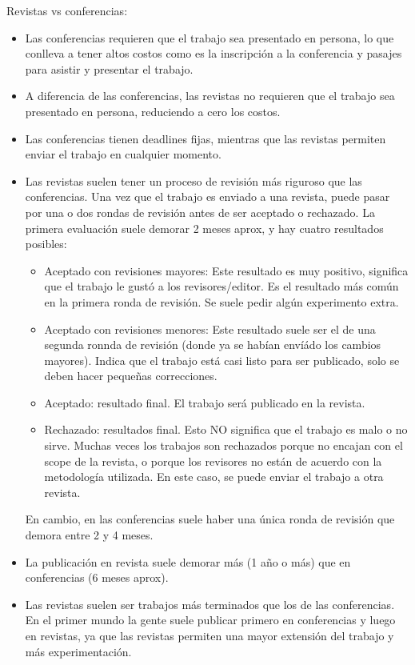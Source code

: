 \documentclass[a4paper,	11pt]{article}
\begin{document}
Revistas vs conferencias:
\begin{itemize}
    \item Las conferencias requieren que el trabajo sea presentado en persona, lo que conlleva a tener altos costos como es la inscripción a la conferencia y pasajes para asistir y presentar el trabajo.
    \item A diferencia de las conferencias, las revistas no requieren que el trabajo sea presentado en persona, reduciendo a cero los costos.
    \item Las conferencias tienen deadlines fijas, mientras que las revistas permiten enviar el trabajo en cualquier momento.
    \item Las revistas suelen tener un proceso de revisión más riguroso que las conferencias. Una vez que el trabajo es enviado a una revista, puede pasar por una o dos rondas de revisión antes de ser aceptado o rechazado. La primera evaluación suele demorar 2 meses aprox, y hay cuatro resultados posibles:
    \begin{itemize}
        \item Aceptado con revisiones mayores: Este resultado es muy positivo, significa que el trabajo le gustó a los revisores/editor. Es el resultado más común en la primera ronda de revisión. Se suele pedir algún experimento extra.
        \item Aceptado con revisiones menores: Este resultado suele ser el de una segunda ronnda de revisión (donde ya se habían envíádo los cambios mayores). Indica que el trabajo está casi listo para ser publicado, solo se deben hacer pequeñas correcciones.
        \item Aceptado: resultado final. El trabajo será publicado en la revista.
        \item Rechazado: resultados final. Esto NO significa que el trabajo es malo o no sirve. Muchas veces los trabajos son rechazados porque no encajan con el scope de la revista, o porque los revisores no están de acuerdo con la metodología utilizada. En este caso, se puede enviar el trabajo a otra revista.
    \end{itemize}En cambio, en las conferencias suele haber una única ronda de revisión que demora entre 2 y 4 meses.
    \item La publicación en revista suele demorar más (1 año o más) que en conferencias (6 meses aprox).
    \item Las revistas suelen ser trabajos más terminados que los de las conferencias. En el primer mundo la gente suele publicar primero en conferencias y luego en revistas, ya que las revistas permiten una mayor extensión del trabajo y más experimentación.
\end{itemize}
\end{document}
